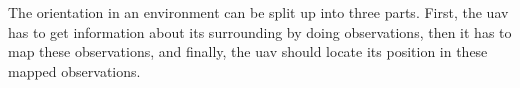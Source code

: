 The orientation in an environment can be split up into three parts. First, the \acs{uav} has to get information about its surrounding by doing observations, then it has to map these observations, and finally, the \acs{uav} should locate its position in these mapped observations.